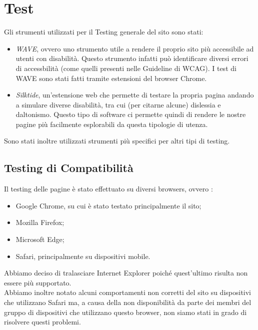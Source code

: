 \section{Test}

  Gli strumenti utilizzati per il Testing generale del sito sono stati:
  \begin{itemize}
    \item \textit{WAVE}, ovvero uno strumento utile a rendere il proprio sito più accessibile ad utenti con disabilità. Questo strumento infatti può identificare diversi errori di accessbilità (come quelli presenti nelle Guideline di WCAG). I test di WAVE sono stati fatti tramite estensioni del browser Chrome.
    \item \textit{Silktide}, un'estensione web che permette di testare la propria pagina andando a simulare diverse disabilità, tra cui (per citarne alcune) dislessia e daltonismo. Questo tipo di software ci permette quindi di rendere le nostre pagine più facilmente esplorabili da questa tipologie di utenza.
  \end{itemize}
  Sono stati inoltre utilizzati strumenti più specifici per altri tipi di testing.
	
  \subsection{Testing di Compatibilità}
    Il testing delle pagine è stato effettuato su diversi browsers, ovvero :
    \begin{itemize}
      \item Google Chrome, su cui è stato testato principalmente il sito;
      \item Mozilla Firefox;
      \item  Microsoft Edge;
      \item Safari, principalmente su dispositivi mobile.
    \end{itemize}
    Abbiamo deciso di tralasciare Internet Explorer poiché quest'ultimo risulta non essere più supportato. \\ 
    Abbiamo inoltre notato alcuni comportamenti non corretti del sito su dispositivi che utilizzano Safari ma, a causa della non disponibilità da parte dei membri del gruppo di dispositivi che utilizzano questo browser,
    non siamo stati in grado di risolvere questi problemi.

